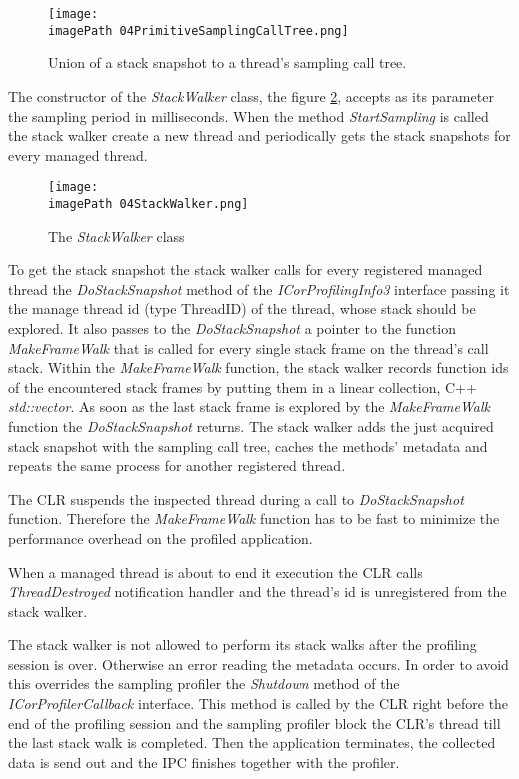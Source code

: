 \begin{figure}
	\centering
		\texttt{[image: \\imagePath 04PrimitiveSamplingCallTree.png]}
		\caption{ Union of a stack snapshot to a thread's sampling call tree. }
	\label{fig:04PrimitiveSamplingCallTree}
\end{figure}

The constructor of the \textit{StackWalker} class, the figure \ref{fig:04StackWalker}, accepts as its parameter the sampling period in milliseconds. When the method \textit{StartSampling} is called the stack walker create a new thread and periodically gets the stack snapshots for every managed thread.

\begin{figure}
	\centering
		\texttt{[image: \\imagePath 04StackWalker.png]}
		\caption{ The \textit{StackWalker} class}
	\label{fig:04StackWalker}
\end{figure}


To get the stack snapshot the stack walker calls for every registered managed thread the \textit{DoStackSnapshot} method of the \textit{ICorProfilingInfo3} interface passing it the manage thread id (type ThreadID) of the thread, whose stack should be explored. It also passes to the \textit{DoStackSnapshot} a pointer to the function \textit{MakeFrameWalk} that is called for every single stack frame on the thread's call stack. Within the \textit{MakeFrameWalk} function, the stack walker records function ids of the encountered stack frames by putting them in a linear collection, C++ \textit{std::vector}. As soon as the last stack frame is explored by the \textit{MakeFrameWalk} function the \textit{DoStackSnapshot} returns. The stack walker adds the just acquired stack snapshot with the sampling call tree, caches the methods' metadata and repeats the same process for another registered thread. 

The CLR suspends the inspected thread during a call to \textit{DoStackSnapshot} function. Therefore the \textit{MakeFrameWalk} function has to be fast to minimize the performance overhead on the profiled application.

When a managed thread is about to end it execution the CLR calls \textit{ThreadDestroyed} notification handler and the thread's id is unregistered from the stack walker.

The stack walker is not allowed to perform its stack walks after the profiling session is over. Otherwise an error reading the metadata occurs. In order to avoid this overrides the sampling profiler the \textit{Shutdown} method of the \textit{ICorProfilerCallback} interface. This method is called by the CLR right before the end of the profiling session and the sampling profiler block the CLR's thread till the last stack walk is completed. Then the application terminates, the collected data is send out and the IPC finishes together with the profiler.

